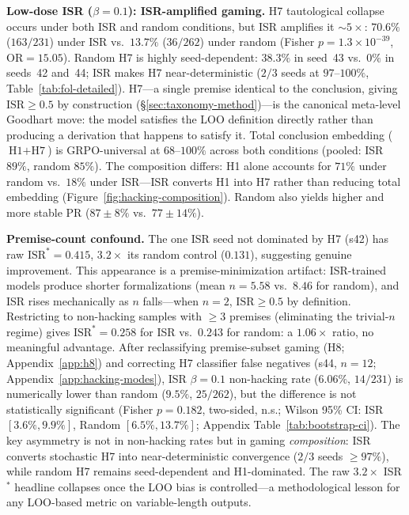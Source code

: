 \textbf{Low-dose ISR ($\beta{=}0.1$): ISR-amplified gaming.}
H7 tautological collapse occurs under both ISR and random conditions, but ISR amplifies it ${\sim}5\times$: $70.6\%$ ($163/231$) under ISR vs.\ $13.7\%$ ($36/262$) under random (Fisher $p{=}1.3{\times}10^{-39}$, $\text{OR}{=}15.05$). %
Random H7 is highly seed-dependent: $38.3\%$ in seed~43 vs.\ $0\%$ in seeds~42 and~44; ISR makes H7 near-deterministic ($2/3$ seeds at $97$--$100\%$, Table~\ref{tab:fol-detailed}).
H7---a single premise identical to the conclusion, giving $\text{ISR}\geq 0.5$ by construction (\S\ref{sec:taxonomy-method})---is the canonical meta-level Goodhart move: the model satisfies the LOO definition directly rather than producing a derivation that happens to satisfy it.
Total conclusion embedding ($\text{H1}+\text{H7}$) is GRPO-universal at $68$--$100\%$ across both conditions (pooled: ISR $89\%$, random $85\%$).
The composition differs: H1 alone accounts for $71\%$ under random vs.\ $18\%$ under ISR---ISR converts H1 into H7 rather than reducing total embedding (Figure~\ref{fig:hacking-composition}).
Random also yields higher and more stable PR ($87{\pm}8\%$ vs.\ $77{\pm}14\%$).

\textbf{Premise-count confound.}
The one ISR seed not dominated by H7 (s42) has raw $\text{ISR}^{*}{=}0.415$, $3.2\times$ its random control ($0.131$), suggesting genuine improvement.
This appearance is a premise-minimization artifact: ISR-trained models produce shorter formalizations (mean $n{=}5.58$ vs.\ $8.46$ for random), and ISR rises mechanically as $n$ falls---when $n{=}2$, $\text{ISR}\geq 0.5$ by definition.
Restricting to non-hacking samples with $\geq{3}$ premises (eliminating the trivial-$n$ regime) gives $\text{ISR}^{*}{=}0.258$ for ISR vs.\ $0.243$ for random: a $1.06\times$ ratio, no meaningful advantage. %
After reclassifying premise-subset gaming (H8; Appendix~\ref{app:h8}) and correcting H7 classifier false negatives (s44, $n{=}12$; Appendix~\ref{app:hacking-modes}), ISR $\beta{=}0.1$ non-hacking rate ($6.06\%$, $14/231$) is numerically lower than random ($9.5\%$, $25/262$), but the difference is not statistically significant (Fisher $p{=}0.182$, two-sided, n.s.; Wilson 95\% CI: ISR $[3.6\%, 9.9\%]$, Random $[6.5\%, 13.7\%]$; Appendix Table~\ref{tab:bootstrap-ci}). %
The key asymmetry is not in non-hacking rates but in gaming \emph{composition}: ISR converts stochastic H7 into near-deterministic convergence ($2/3$ seeds ${\geq}97\%$), while random H7 remains seed-dependent and H1-dominated.
The raw $3.2\times$ ISR$^*$ headline collapses once the LOO bias is controlled---a methodological lesson for any LOO-based metric on variable-length outputs. %

